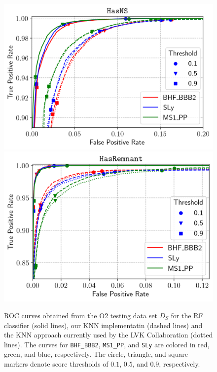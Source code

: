 \begin{figure}%
\includegraphics[width=0.47\linewidth]{ROC_O2testing_all_impl-NS}
\includegraphics[width=0.45\linewidth]{ROC_O2testing_all_impl-REM}
\caption{\ac{ROC} curves obtained from the \ac{O2} testing data set $D_S$ for the \ac{RF} classifier (solid lines), our \ac{KNN} implementatin (dashed lines) and the \ac{KNN} approach currently used by the \ac{LVK} Collaboration (dotted lines). The curves for {\tt BHF\_BBB2}, {\tt MS1\_PP}, and {\tt SLy} are colored in red, green, and blue, respectively. The circle, triangle, and square markers denote score thresholds of
$0.1$, $0.5$, and $0.9$, respectively.}
\label{fig:rocO2_all}
\end{figure}




